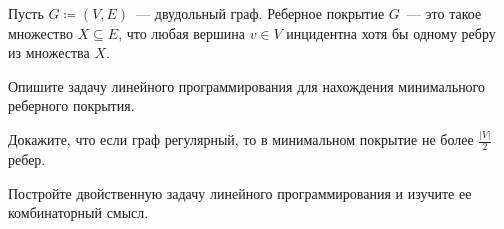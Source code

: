 Пусть $G \coloneqq (V, E)$~--- двудольный граф. Реберное покрытие $G$~--- это такое множество $X
\subseteq E$, что любая вершина $v \in V$ инцидентна хотя бы одному ребру из множества $X$.
\begin{enumcyr}
    \item Опишите задачу линейного программирования для нахождения минимального реберного покрытия.
    \item Докажите, что если граф регулярный, то в минимальном покрытие не более $\frac{|V|}{2}$ ребер.
    \item Постройте двойственную задачу линейного программирования и изучите ее комбинаторный смысл.
\end{enumcyr}
